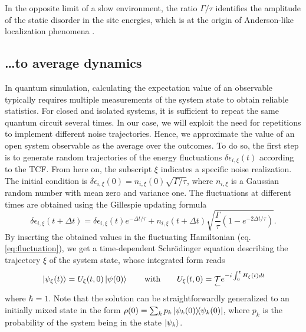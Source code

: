 \documentclass[12pt, amsmath, amssymb, graphicx]{iopart}
\begin{document}
In the opposite limit of a slow environment, the ratio $\Gamma/\tau$ identifies the amplitude of the static disorder in the site energies, which is at the origin of Anderson-like localization phenomena \cite{Moro2018a, Moix2013, Somoza2017}.

\subsection{\label{subsec:to average dynamics}\dots  to average dynamics}
In quantum simulation, calculating the expectation value of an observable typically requires multiple measurements of the system state to obtain reliable statistics. For closed and isolated systems, it is sufficient to repeat the same quantum circuit several times. In our case, we will exploit the need for repetitions to implement different noise trajectories. Hence, we approximate the value of an open system observable as the average over the outcomes. To do so, the first step is to generate random trajectories of the energy fluctuations $\delta \epsilon_{i, \xi}(t)$ according to the TCF. From here on, the subscript $\xi$ indicates a specific noise realization. The initial condition is $\delta \epsilon_{i, \xi}(0) = n_{i, \xi}(0) \sqrt{\Gamma/\tau}$, where $n_{i, \xi}$ is a Gaussian random number with mean zero and variance one. The fluctuations at different times are obtained using the Gillespie updating formula \cite{Gillespie1996}
%
\begin{equation} \label{eq:fluctuation}
    \delta \epsilon_{i, \xi}(t + \Delta t) = \delta \epsilon_{i, \xi}(t) e^{- \Delta t/\tau} + n_{i, \xi}(t + \Delta t) \sqrt{\frac{\Gamma}{\tau} \left( 1 - e^{-2 \Delta t/\tau} \right)}.
\end{equation}
%
By inserting the obtained values in the fluctuating Hamiltonian (eq. \ref{eq:fluctuation}), we get a time-dependent Schr\"odinger equation describing the trajectory $\xi$ of the system state, whose integrated form reads
%
\begin{equation}{\label{eq:unitary_evolution}}
    \ket{\psi_{\xi}(t)} = U_{\xi}(t,0) \ket{\psi(0)} \qquad \text{with} \qquad U_{\xi}(t,0) = \underset{\leftarrow}{\mathcal{T}} e^{-i \int_{0}^{t} H_{\xi}(t) dt}
\end{equation}
%
where $\hbar=1$. Note that the solution can be straightforwardly generalized to an initially mixed state in the form $\rho(0) = \sum_{k} p_{k} \ketbra{\psi_{k}(0)}{\psi_{k}(0)}$, where $p_{k}$ is the probability of the system being in the state $\ket{\psi_{k}}$.
\end{document}
